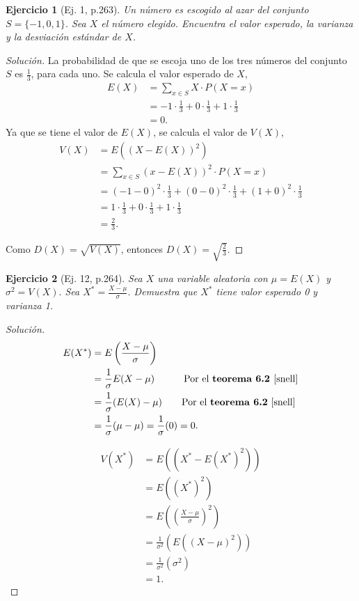 \documentclass[12pt,letterpaper]{article}
\newtheorem{ej}{Ejercicio}
\begin{document}
\begin{ej}[Ej. 1, p.263]
Un número es escogido al azar del conjunto $S=\{-1,0,1\}$. Sea $X$ el número elegido. Encuentra el valor esperado, la varianza y la desviación estándar de $X$.
\end{ej}
\begin{proof}[Solución]
La probabilidad de que se escoja uno de los tres números del conjunto $S$ es $\frac{1}{3}$, para cada uno. Se calcula el valor esperado de $X$,
\begin{align}
E(X) &= \sum_{x \in S} X\cdot P(X=x) \\ &= -1 \cdot \frac{1}{3} + 0\cdot \frac{1}{3} + 1 \cdot\frac{1}{3} \\ &=0.
\end{align}
Ya que se tiene el valor de $E(X)$, se calcula el valor de $V(X)$,
\begin{align}
V(X) &= E((X-E(X))^2) \\ &= \sum_{x \in S} (x-E(X))^2 \cdot P(X=x) \\&= (-1-0)^2\cdot\frac{1}{3} + (0-0)^2\cdot\frac{1}{3} + (1+0)^2\cdot \frac{1}{3} \\ &= 1\cdot \frac{1}{3} + 0\cdot \frac{1}{3} + 1\cdot \frac{1}{3} \\ &=\frac{2}{3}.
\end{align}

Como $D(X) = \sqrt{V(X)}$, entonces $D(X)=\sqrt{\frac{2}{3}}$.
\end{proof}

\begin{ej}[Ej. 12, p.264]
Sea $X$ una variable aleatoria con $\mu = E(X)$ y $\sigma^2 = V(X).$ Sea $X^* = \frac{X-\mu}{\sigma}$. Demuestra que $X^*$ tiene valor esperado 0 y varianza 1. 
\end{ej}
\begin{proof}[Solución]
\begin{align}
E(X^*) &= E\left(\frac{X-\mu}{\sigma}\right) \\ &= \frac{1}{\sigma} E(X - \mu) \qquad \quad\text{Por el \textbf{teorema 6.2 }\cite{snell}} \\&= \frac{1}{\sigma} (E(X) - \mu) \qquad \text{Por el \textbf{teorema 6.2} \cite{snell}} \\ &= \frac{1}{\sigma}(\mu - \mu) = \frac{1}{\sigma} (0) = 0.
\end{align}

\begin{align}
V(X^*)&=E((X^* - E(X^*)^2)) \\ &= E((X^*)^2) \\ &= E\left(\left( \frac{X-\mu}{\sigma} \right)^2\right) \\ &= \frac{1}{\sigma^2} \left(E\left(\left(X-\mu\right)^2\right)\right) \\ &= \frac{1}{\sigma^{2}} \left(\sigma^{2}\right) \\ &=1.
\end{align}
\end{proof}
\end{document}
